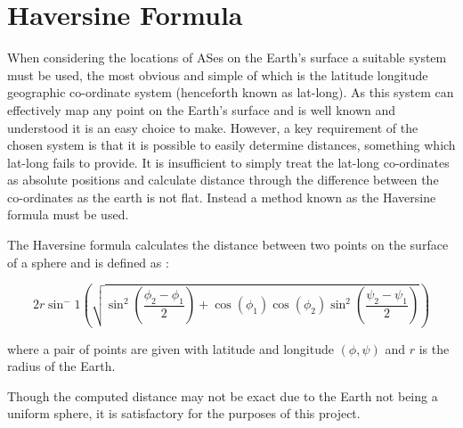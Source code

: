 \section{Haversine Formula}
\label{sec:haversine}
When considering the locations of ASes on the Earth's surface a suitable system must be used, the most obvious and simple of which is the latitude longitude geographic co-ordinate system (henceforth known as lat-long). As this system can effectively map any point on the Earth's surface and is well known and understood it is an easy choice to make. However, a key requirement of the chosen system is that it is possible to easily determine distances, something which lat-long fails to provide. It is insufficient to simply treat the lat-long co-ordinates as absolute positions and calculate distance through the difference between the co-ordinates as the earth is not flat. Instead a method known as the Haversine formula must be used.

The Haversine formula calculates the distance between two points on the surface of a sphere and is defined as \cite{chopde_landmark_2013}:

\begin{equation}
\label{haversine_formula}
2r\sin^-1\left(\sqrt{\sin^2\left(\frac{\phi_2 - \phi_1}{2}\right) + \cos(\phi_1) \cos(\phi_2) \sin^2\left(\frac{\psi_2 - \psi_1}{2}\right)}\right)
\end{equation}

where a pair of points are given with latitude and longitude $(\phi,\psi)$ and $r$ is the radius of the Earth. 

Though the computed distance may not be exact due to the Earth not being a uniform sphere, it is satisfactory for the purposes of this project.